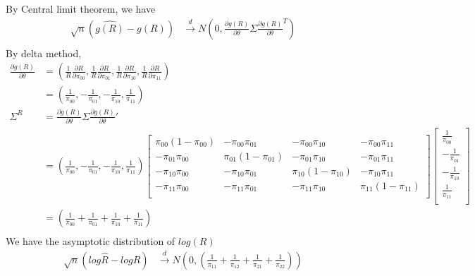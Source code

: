 \begin{itemize}
	By Central limit theorem, we have 
	\begin{align*}
		\sqrt{n} \left(\hat{g(R)} - g(R) \right) & \xrightarrow[]{d} N \left(0, \frac{\partial g(R)}{\partial \theta} \Sigma   \frac{\partial g(R)}{\partial \theta}^T \right) \\
	\end{align*}
	By delta method,
	\begin{align*}
		\frac{\partial g(R)}{\partial \theta} &= \left(
		\frac{1}{R} \frac{\partial R}{\partial \pi_{00}} ,  \frac{1}{R}\frac{\partial R}{\partial \pi_{01}},   \frac{1}{R}\frac{\partial R}{\partial \pi_{10}} ,  \frac{1}{R} \frac{\partial R}{\partial \pi_{11}} \right)\\
		& = \left( \frac{1}{\pi_{00}},  -\frac{1}{\pi_{01}},  -\frac{1}{\pi_{10}}, \frac{1}{\pi_{11}} \right)\\
		\Sigma^{R} &= \frac{\partial g(R)}{\partial \theta} \Sigma \frac{\partial g(R)}{\partial \theta}' \\
		&= \left( \frac{1}{\pi_{00}},  -\frac{1}{\pi_{01}},  -\frac{1}{\pi_{10}}, \frac{1}{\pi_{11}} \right) \begin{bmatrix}
			\pi_{00}(1-\pi_{00}) &  -\pi_{00}\pi_{01}&  -\pi_{00}\pi_{10} &  -\pi_{00}\pi_{11}\\
			-\pi_{01}\pi_{00} & \pi_{01}(1-\pi_{01}) & -\pi_{01}\pi_{10}   & -\pi_{01}\pi_{11}  \\
			-\pi_{10}\pi_{00} & -\pi_{10}\pi_{01} &  \pi_{10}(1-\pi_{10})  & -\pi_{10}\pi_{11}  \\
			-\pi_{11}\pi_{00} &  -\pi_{11}\pi_{01} & -\pi_{11}\pi_{10}   & \pi_{11}(1-\pi_{11})  \\
		\end{bmatrix} \begin{bmatrix}
			\frac{1}{\pi_{00}} \\
			-\frac{1}{\pi_{01}}   \\
			-\frac{1}{\pi_{10}}  \\
			\frac{1}{\pi_{11}}  \\
		\end{bmatrix}\\
		&= (\frac{1}{\pi_{00}} + \frac{1}{\pi_{01}} + \frac{1}{\pi_{10}} + \frac{1}{\pi_{11}})\\
	\end{align*}
	We have the asymptotic distribution of $log(R)$
	\begin{align*}
		\sqrt{n} (log\hat{R} - logR) & \xrightarrow[]{d} N \left(0, (\frac{1}{\pi_{11}} + \frac{1}{\pi_{12}} + \frac{1}{\pi_{21}} + \frac{1}{\pi_{22}}) \right) 

\end{align*}
\end{itemize}
